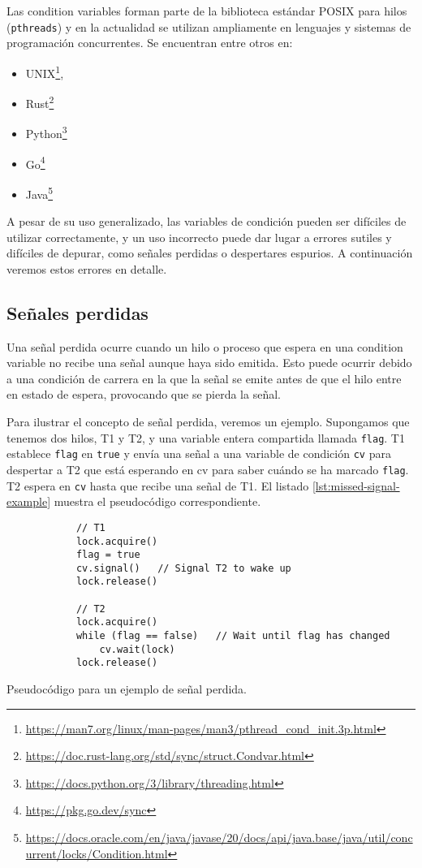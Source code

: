 Las condition variables forman parte de la biblioteca estándar POSIX para hilos (\texttt{pthreads}) \cite{nichols1996pthreads}
y en la actualidad se utilizan ampliamente en lenguajes y sistemas de programación
concurrentes. Se encuentran entre otros en:

\begin{itemize}
      \item UNIX\footnote{\url{https://man7.org/linux/man-pages/man3/pthread_cond_init.3p.html}},
      \item Rust\footnote{\url{https://doc.rust-lang.org/std/sync/struct.Condvar.html}}
      \item Python\footnote{\url{https://docs.python.org/3/library/threading.html}}
      \item Go\footnote{\url{https://pkg.go.dev/sync}}
      \item Java\footnote{
                  \url{https://docs.oracle.com/en/java/javase/20/docs/api/java.base/java/util/concurrent/locks/Condition.html}}
\end{itemize}

A pesar de su uso generalizado, las variables de condición pueden ser difíciles de utilizar
correctamente, y un uso incorrecto puede dar lugar a errores sutiles y difíciles de depurar, como
señales perdidas o despertares espurios. A continuación veremos estos errores en detalle.

\subsection{Señales perdidas}

Una señal perdida ocurre cuando un hilo o proceso que espera en una condition variable no
recibe una señal aunque haya sido emitida. Esto puede ocurrir debido a una condición de
carrera en la que la señal se emite antes de que el hilo entre en estado de espera, provocando
que se pierda la señal.

Para ilustrar el concepto de señal perdida, veremos un ejemplo. Supongamos que tenemos
dos hilos, T1 y T2, y una variable entera compartida llamada \texttt{flag}. T1 establece \texttt{flag} en \texttt{true}
y envía una señal a una variable de condición \texttt{cv} para despertar a T2 que está esperando en
cv para saber cuándo se ha marcado \texttt{flag}. T2 espera en \texttt{cv} hasta que recibe una señal de
T1. El listado \ref{lst:missed-signal-example} muestra el pseudocódigo correspondiente.

\begin{listing}[!htb]
      \begin{verbatim}
            // T1
            lock.acquire()
            flag = true
            cv.signal()   // Signal T2 to wake up
            lock.release()
            
            // T2
            lock.acquire()
            while (flag == false)   // Wait until flag has changed
                cv.wait(lock)
            lock.release()
      \end{verbatim}
      \caption{Pseudocódigo para un ejemplo de señal perdida.}
      \label{lst:missed-signal-example}
\end{listing}

